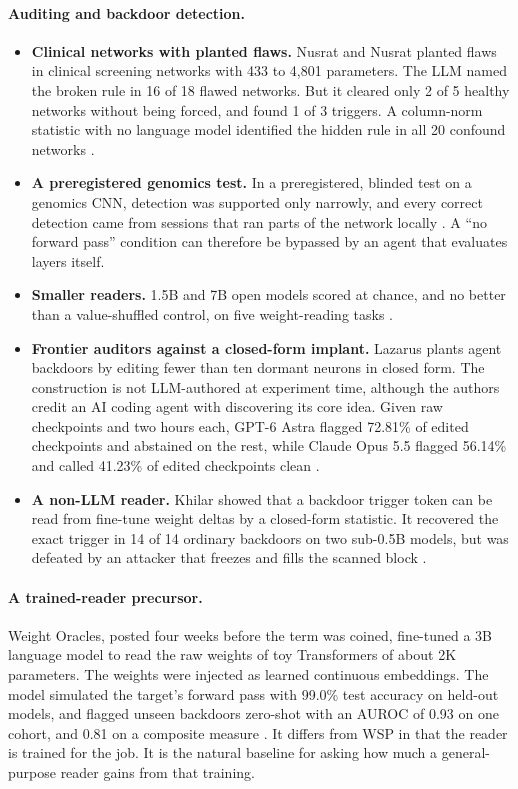 \paragraph{Auditing and backdoor detection.}
\begin{itemize}[leftmargin=*,itemsep=2pt]
\item \textbf{Clinical networks with planted flaws.} Nusrat and Nusrat planted flaws in clinical screening networks with 433 to 4{,}801 parameters. The LLM named the broken rule in 16 of 18 flawed networks. But it cleared only 2 of 5 healthy networks without being forced, and found 1 of 3 triggers. A column-norm statistic with no language model identified the hidden rule in all 20 confound networks \citep{ax2611_05341}.
\item \textbf{A preregistered genomics test.} In a preregistered, blinded test on a genomics CNN, detection was supported only narrowly, and every correct detection came from sessions that ran parts of the network locally \citep{zen24040591}. A ``no forward pass'' condition can therefore be bypassed by an agent that evaluates layers itself.
\item \textbf{Smaller readers.} 1.5B and 7B open models scored at chance, and no better than a value-shuffled control, on five weight-reading tasks \citep{zen24047726}.
\item \textbf{Frontier auditors against a closed-form implant.} Lazarus plants agent backdoors by editing fewer than ten dormant neurons in closed form. The construction is not LLM-authored at experiment time, although the authors credit an AI coding agent with discovering its core idea. Given raw checkpoints and two hours each, GPT-6 Astra flagged 72.81\% of edited checkpoints and abstained on the rest, while Claude Opus 5.5 flagged 56.14\% and called 41.23\% of edited checkpoints clean \citep{ax2611_15118}.
\item \textbf{A non-LLM reader.} Khilar showed that a backdoor trigger token can be read from fine-tune weight deltas by a closed-form statistic. It recovered the exact trigger in 14 of 14 ordinary backdoors on two sub-0.5B models, but was defeated by an attacker that freezes and fills the scanned block \citep{ax2611_19304}.
\end{itemize}

\paragraph{A trained-reader precursor.} Weight Oracles, posted four weeks before the term was coined, fine-tuned a 3B language model to read the raw weights of toy Transformers of about 2K parameters. The weights were injected as learned continuous embeddings. The model simulated the target's forward pass with 99.0\% test accuracy on held-out models, and flagged unseen backdoors zero-shot with an AUROC of 0.93 on one cohort, and 0.81 on a composite measure \citep{ax2610_07334}. It differs from WSP in that the reader is trained for the job. It is the natural baseline for asking how much a general-purpose reader gains from that training.

